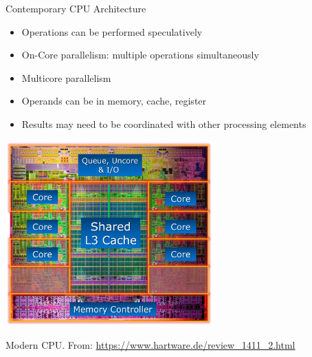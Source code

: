 \begin{frame}{Contemporary CPU Architecture}

  \begin{itemize}
    \tightlist
  \item
    Operations can be performed speculatively
  \item
    On-Core parallelism: multiple operations simultaneously 
  \item 
    Multicore  parallelism
  \item
    Operands can be in memory, cache, register
  \item
    Results may need to be coordinated with other processing elements
  \end{itemize}

  \begin{center}
    \includegraphics[width=0.6\textwidth]{pic/die}

    {\scriptsize Modern CPU. From: \url{https://www.hartware.de/review_1411_2.html}}
  \end{center}

\end{frame}

